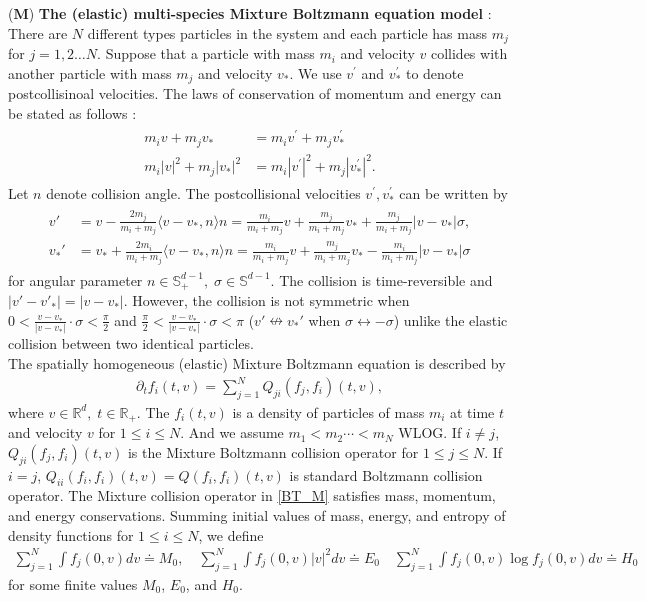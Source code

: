 \documentclass[reqno,10pt]{amsart}
\numberwithin{equation}{section}
\begin{document}
\noindent ($\mathbf{M}$) {\bf The (elastic) multi-species Mixture Boltzmann equation model} : There are $N$ different types particles in the system and each particle has mass $m_{j}$ for $j=1,2 \dots N.$ Suppose that a particle with mass $m_i$ and velocity $v$ collides with another particle with mass $m_j$ and velocity $v_*$.  We use $v^{\prime}$ and $v_{*}^{\prime}$ to denote postcollisinoal velocities. The laws of conservation of momentum and energy can be stated as follows :
\begin{align} \label{coll_M}
\begin{split}
     m_i v + m_j v_* &=  m_i v^{\prime} + m_j v_{*}^{\prime} \\
    m_i |v|^2 + m_j |v_{*}|^2 &=  m_i |v^{\prime}|^2 + m_j |v_{*}^{\prime}|^2. 
\end{split}
\end{align}
Let ${n}$ denote collision angle. The postcollisional velocities $v^{\prime},v^{\prime}_{*}$ can be written by 
\begin{align} \label{v'_M}
\begin{split}
    v' &=v-\frac{2m_j}{m_i+m_j}\langle v-v_*, n \rangle {n}= \frac{m_i}{m_i+m_j}v+\frac{m_j}{m_i+m_j}v_*+\frac{m_j}{m_i+m_j}|v-v_*|\sigma, \\
    v_*' &= v_*+\frac{2m_i}{m_i+m_j}\langle v-v_*, n \rangle {n}=\frac{m_i}{m_i+m_j}v+\frac{m_j}{m_i+m_j}v_*-\frac{m_i}{m_i+m_j}|v-v_*|\sigma
\end{split}
\end{align}
for angular parameter ${n} \in \mathbb{S}^{d-1}_{+}, \; {\sigma} \in \mathbb{S}^{d-1}.$ The collision is time-reversible and $|v'-v'_*| = |v-v_*|$. However, the collision is not symmetric when $0 < \frac{v-v_*}{|v-v_*|} \cdot \sigma < \frac{\pi}{2}$ and $\frac{\pi}{2} < \frac{v-v_*}{|v-v_*|} \cdot \sigma < \pi$ ($v' \nleftrightarrow v_*'$ when ${\sigma} \leftrightarrow -{\sigma}$) unlike the elastic collision between two identical particles.  \\

\noindent The spatially homogeneous (elastic) Mixture Boltzmann equation is described by 
\begin{align} \label{BT_M}
    \partial_t f_i (t,v) = \sum_{j=1}^{N} Q_{ji}(f_j,f_i) (t,v), 
\end{align} where $v \in \mathbb{R}^d, \; t \in \mathbb{R}_{+}.$ The $f_i(t,v)$ is a density of particles of mass $m_i$ at time $t$ and velocity $v$ for $1 \leq i \leq N$. And we assume $m_1<m_2 \cdots < m_N$ WLOG. If $i \neq j$, $Q_{ji}(f_j,f_i)(t,v)$ is the Mixture Boltzmann collision operator for $1 \leq j \leq N.$ If $i=j$, $Q_{ii}(f_i,f_i)(t,v)=Q(f_{i}, f_{i})(t,v)$ is standard Boltzmann collision operator. The Mixture collision operator in \eqref{BT_M} satisfies mass, momentum, and energy conservations. Summing initial values of mass, energy, and entropy of density functions for $1 \leq i \leq N$, we define 
\begin{align} \label{hydro_M}
\sum_{j=1}^{N} \int f_j(0,v) dv \doteq M_0, \quad
\sum_{j=1}^{N} \int f_j(0,v)|v|^{2} dv \doteq E_0\quad
\sum_{j=1}^{N} \int f_j(0,v)\log f_j(0,v) dv \doteq H_0
\end{align} 
for some finite values $M_0$, $E_0$, and $H_0$. \\
\end{document}
